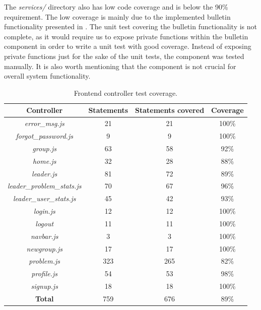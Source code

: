 The \textit{services/} directory also has low code coverage and is below the 90\% requirement. The low coverage is mainly due to the implemented bulletin functionality presented in . The unit test covering the bulletin functionality is not complete, as it would require us to expose private functions within the bulletin component in order to write a unit test with good coverage. Instead of exposing private functions just for the sake of the unit tests, the component was tested manually. It is also worth mentioning that the component is not crucial for overall system functionality. \\

\begin{table}[h!]
    \centering
    \begin{tabular}{c c c c}
      \hline
      \textbf{Controller} & \textbf{Statements} & \textbf{Statements covered} & \textbf{Coverage} \\ \hline
      \textit{error\_msg.js} & 21 & 21 & 100\% \\
      \textit{forgot\_password.js} & 9 & 9 & 100\% \\
      \textit{group.js} & 63 & 58 & 92\% \\
      \textit{home.js} & 32 & 28 & 88\% \\
      \textit{leader.js} & 81 & 72 & 89\% \\
      \textit{leader\_problem\_stats.js} & 70 & 67 & 96\% \\
      \textit{leader\_user\_stats.js} & 45 & 42 & 93\% \\
      \textit{login.js} & 12 & 12 & 100\% \\
      \textit{logout} & 11 & 11 & 100\% \\
      \textit{navbar.js} & 3 & 3 & 100\% \\
      \textit{newgroup.js} & 17 & 17 & 100\% \\
      \textit{problem.js} & 323 & 265 & 82\% \\
      \textit{profile.js} & 54 & 53 & 98\% \\
      \textit{signup.js} & 18 & 18 & 100\% \\ \hline
      \textbf{Total} & 759 & 676 & 89\% \\ \hline
    \end{tabular}
    \caption{Frontend controller test coverage.}
    \label{tab:frontend-coverage-controllers}
\end{table}

